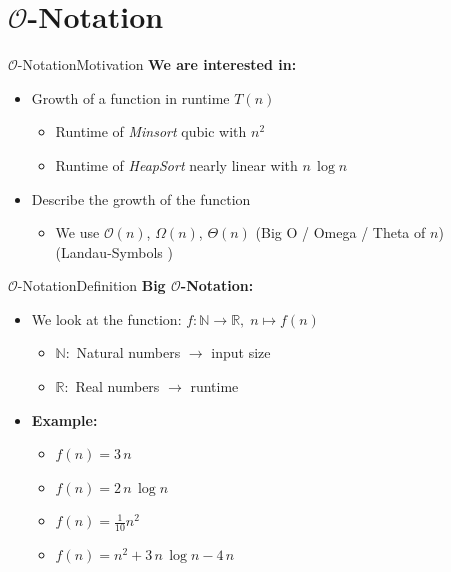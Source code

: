 \section{\texorpdfstring{$\mathcal{O}$}{O}-Notation}


\begin{frame}{$\mathcal{O}$-Notation}{Motivation}
  \textbf{We are interested in:}
  \begin{itemize}
    \item
      Growth of a function in runtime $T(n)$
    \begin{itemize}
      \item
        Runtime of \textit{Minsort} qubic with $n^2$
      \item
         Runtime of \textit{HeapSort} nearly linear with $n \, \log n$
    \end{itemize}
    \item
      Describe the growth of the function
    \begin{itemize}
      \item
        We use
        {\color{Mittel-Blau}$\mathcal{O}(n)$},
        {\color{Mittel-Blau}$\Omega (n)$},
        {\color{Mittel-Blau}$\Theta (n)$}
        (Big O / Omega / Theta of $n$)\\
        (Landau-Symbols \cite{wikipedia_big_o_notation})
    \end{itemize}
  \end{itemize}
\end{frame}


\begin{frame}{$\mathcal{O}$-Notation}{Definition}
  \textbf{Big $\mathcal{O}$-Notation:}
  \begin{itemize}
    \item
      We look at the function:
      $f\!: \mathbb{N} \to \mathbb{R}, \; n \mapsto f(n)$
      \begin{itemize}
        \item
          $\mathbb{N}\!:$ Natural numbers $\rightarrow$ input size
        \item
          $\mathbb{R}\!:$ Real numbers $\rightarrow$ runtime
      \end{itemize}
   \item
     \textbf{Example:}
   \begin{itemize}
     \item
       $f(n) = 3 \, n$
     \item
       $f(n) = 2 \, n \, \log n$
     \item
       $f(n) = \frac{1}{10} n^2$
     \item
       $f(n) = n^2 + 3 \, n \, \log n - 4 \, n$
    \end{itemize}
  \end{itemize}
\end{frame}


